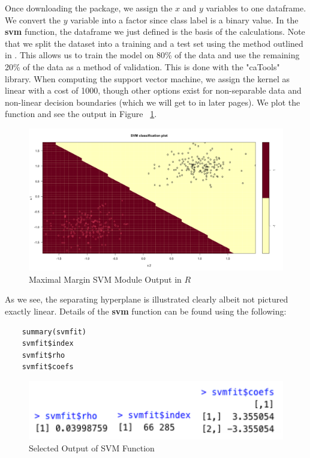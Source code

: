 \documentclass[12pt]{article}
\begin{document}
Once downloading the package, we assign the $x$ and $y$ variables to one dataframe. We convert the $y$ variable into a factor since class label is a binary value. In the \textbf{svm} function, the dataframe we just defined is the basis of the calculations. Note that we split the dataset into a training and a test set using the method outlined in \cite{r_train_test_split}. This allows us to train the model on 80\% of the data and use the remaining 20\% of the data as a method of validation. This is done with the "caTools" library. When computing the support vector machine, we assign the kernel as linear with a cost of 1000, though other options exist for non-separable data and non-linear decision boundaries (which we will get to in later pages). We plot the function and see the output in Figure ~\ref{fig_mmc_module_output}.

\begin{figure}
    \centering
    \includegraphics[width=5.5in]{Figures/mmc/mmc_module_output.png}
    \caption{Maximal Margin SVM Module Output in $R$}
    \label{fig_mmc_module_output}
\end{figure}
As we see, the separating hyperplane is illustrated clearly albeit not pictured exactly linear. Details of the \textbf{svm} function can be found using the following:
\begin{verbatim}
    summary(svmfit)
    svmfit$index
    svmfit$rho
    svmfit$coefs
\end{verbatim}

\begin{figure}[ht]
    \centering
    \includegraphics[width=5in]{Figures/mmc/mmc_selected_output.png}
    \caption{Selected Output of SVM Function}
    \label{fig_mmc_selected_output}
\end{figure}
\end{document}
